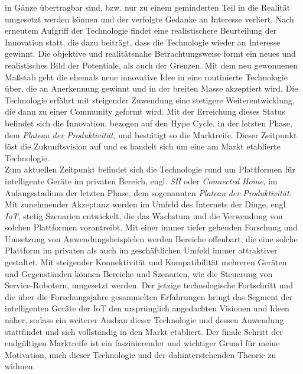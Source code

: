     in Gänze übertragbar sind, bzw. nur zu einem geminderten Teil in die Realität umgesetzt werden können 
    und der verfolgte Gedanke an Interesse verliert. Nach erneutem Aufgriff der Technologie findet eine realistischere 
    Beurteilung der Innovation statt, die dazu beiträgt, dass die Technologie wieder an Interesse gewinnt. Die 
    objektive und realitätsnahe Betrachtungsweise formt ein neues und realistisches Bild der Potentiale, als auch 
    der Grenzen. Mit dem neu gewonnenen Maßstab geht die ehemals neue innovative Idee in eine routinierte Technologie über, 
    die an Anerkennung gewinnt und in der breiten Masse akzeptiert wird. Die Technologie erfährt mit steigender 
    Zuwendung eine stetigere Weiterentwicklung, die dann zu einer Community geformt wird. Mit der Erreichung dieses Status 
    befindet sich die Innovation, bezogen auf den Hype Cycle, in der letzten Phase, dem \textit{Plateau der Produktivität}, 
    und bestätigt so die Marktreife. Dieser Zeitpunkt löst die Zukunftsvision auf und es handelt sich um eine am Markt 
    etablierte Technologie.
    \\ 
    \linebreak
    Zum aktuellen Zeitpunkt befindet sich die Technologie rund um Plattformen für intelligente Geräte im privaten 
    Bereich, engl. \textit{\ac{SH}} oder \textit{Connected Home}, im Anfangsstadium der letzten Phase, dem sogenannten 
    \textit{Plateau der Produktivität}. Mit zunehmender Akzeptanz werden im Umfeld des Internets der Dinge, engl. 
    \textit{\acl{IoT}}, stetig Szenarien entwickelt, die das Wachstum und die Verwendung von solchen Plattformen vorantreibt. 
    Mit einer immer tiefer gehenden Forschung und Umsetzung von Anwendungsbeispielen werden Bereiche offenbart, die 
    eine solche Plattform im privaten als auch im geschäftlichen Umfeld immer attraktiver gestaltet. Mit steigender  
    Konnektivität und Kompatibilität mehreren Geräten und Gegenständen können Bereiche und Szenarien, wie die 
    Steuerung von Service-Robotern, umgesetzt werden. Der jetzige technologische Fortschritt und die über die Forschungsjahre 
    gesammelten Erfahrungen bringt das Segment der intelligenten Geräte der \acs{IoT} den ursprünglich angedachten 
    Visionen und Ideen näher, sodass ein weiterer Ausbau dieser Technologie und dessen Anwendung stattfindet und sich 
    vollständig in den Markt etabliert. Der finale Schritt der endgültigen Marktreife ist ein faszinierender und wichtiger Grund 
    für meine Motivation, mich dieser Technologie und der dahinterstehenden Theorie zu widmen.
